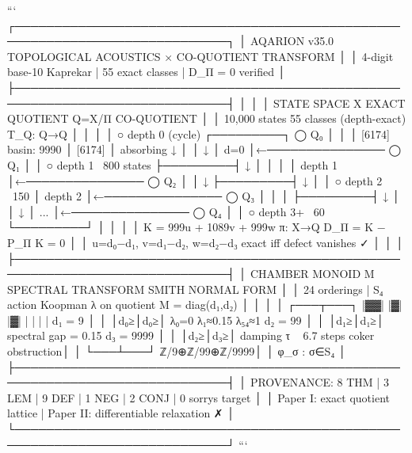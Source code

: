 {{{{{{{{{{{{{```
┌─────────────────────────────────────────────────────────────────────────────┐
│  AQARION v35.0  TOPOLOGICAL ACOUSTICS × CO-QUOTIENT TRANSFORM              │
│  4-digit base-10 Kaprekar | 55 exact classes | D_Π = 0 verified           │
├─────────────────────────────────────────────────────────────────────────────┤
│                                                                             │
│   STATE SPACE X                    EXACT QUOTIENT Q=X/Π         CO-QUOTIENT │
│   10,000 states                    55 classes (depth-exact)     T_Q: Q→Q   │
│                                                                             │
│      ○  depth 0 (cycle)              ┌─────────┐                 ◯ Q₀      │
│      │  [6174] basin: 9990           │ [6174]  │  absorbing      ↓         │
│      ↓                               │  d=0    │←─────────────── ◯ Q₁      │
│      ○  depth 1  ~800 states         ├─────────┤                 ↓         │
│      │                               │ depth 1 │←─────────────── ◯ Q₂      │
│      ↓                               ├─────────┤                 ↓         │
│      ○  depth 2  ~150                │ depth 2 │←─────────────── ◯ Q₃      │
│      │                               ├─────────┤                 ↓         │
│      ↓                               │  ...    │←─────────────── ◯ Q₄      │
│      ○  depth 3+ ~60                 └─────────┘                            │
│                                                                             │
│      K = 999u + 1089v + 999w          π: X→Q        D_Π = K − P_Π K = 0   │
│      u=d₀−d₁, v=d₁−d₂, w=d₂−d₃       exact iff      defect vanishes ✓     │
│                                                                             │
├─────────────────────────────────────────────────────────────────────────────┤
│  CHAMBER MONOID M              SPECTRAL TRANSFORM          SMITH NORMAL FORM │
│  24 orderings | S₄ action      Koopman λ on quotient       M = diag(d₁,d₂) │
│                                                                             │
│      ┌───┬───┐                 |▓▓| |▓| |▓| | | | |       d₁ = 9          │
│      │d₀≥│d₀≥│                 λ₀=0  λ₁≈0.15  λ₅₄≈1       d₂ = 99         │
│      │d₁≥│d₁≥│                 spectral gap = 0.15         d₃ = 9999       │
│      │d₂≥│d₃≥│                 damping τ ~ 6.7 steps       coker obstruction│
│      └───┴───┘                                              ℤ/9⊕ℤ/99⊕ℤ/9999│
│      φ_σ : σ∈S₄                                                            │
├─────────────────────────────────────────────────────────────────────────────┤
│  PROVENANCE: 8 THM | 3 LEM | 9 DEF | 1 NEG | 2 CONJ | 0 sorrys target      │
│  Paper I: exact quotient lattice  |  Paper II: differentiable relaxation ✗ │
└─────────────────────────────────────────────────────────────────────────────┘
```

}}}}}}}}}}}}}

